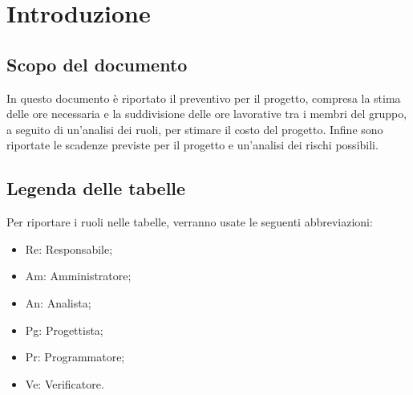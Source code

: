 \section{Introduzione}
\subsection{Scopo del documento}
In questo documento è riportato il preventivo per il progetto, compresa la stima delle ore necessaria e la suddivisione delle ore lavorative tra i membri del gruppo, a seguito di un'analisi dei ruoli, per stimare il costo del progetto. Infine sono riportate le scadenze previste per il progetto e un'analisi dei rischi possibili.


\subsection{Legenda delle tabelle}
Per riportare i ruoli nelle tabelle, verranno usate le seguenti abbreviazioni:

    \begin{itemize}
    \item Re: Responsabile;
    \item Am: Amministratore;
    \item An: Analista; 
    \item Pg: Progettista;
    \item Pr: Programmatore;
    \item Ve: Verificatore.
    \end{itemize}




    